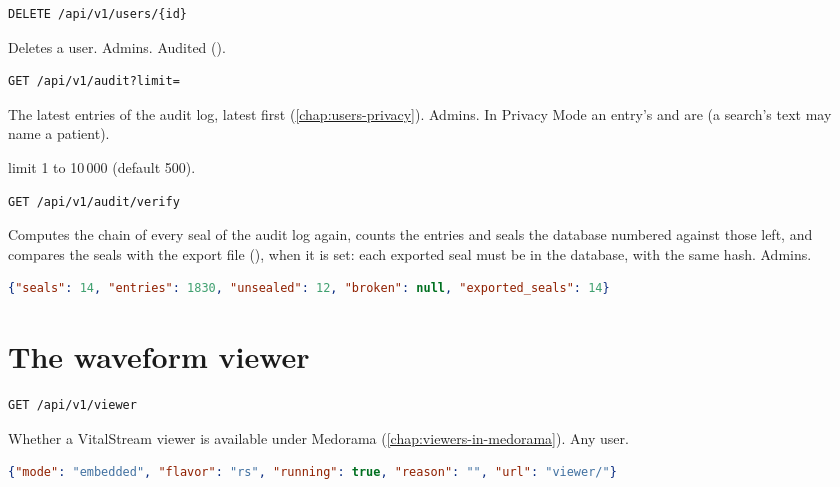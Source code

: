 \begin{lstlisting}[style=signature]
DELETE /api/v1/users/{id}
\end{lstlisting}
Deletes a user. Admins. Audited ().

\begin{lstlisting}[style=signature]
GET /api/v1/audit?limit=
\end{lstlisting}
The latest entries of the audit log, latest first (\cref{chap:users-privacy}). Admins. In
Privacy Mode an entry's  and  are \code{[Withheld]} (a search's text
may name a patient).
\begin{params}
\item[limit] 1 to 10\,000 (default 500).
\end{params}

\begin{lstlisting}[style=signature]
GET /api/v1/audit/verify
\end{lstlisting}
Computes the chain of every seal of the audit log again, counts the entries and seals the
database numbered against those left, and compares the seals with the export file
(), when it is set: each exported seal must be in the database, with the
same hash. Admins.
\begin{lstlisting}[language=JSON]
{"seals": 14, "entries": 1830, "unsealed": 12, "broken": null, "exported_seals": 14}
\end{lstlisting}

\section{The waveform viewer}
\label{sec:http-api-viewer}

\begin{lstlisting}[style=signature]
GET /api/v1/viewer
\end{lstlisting}
Whether a VitalStream viewer is available under Medorama (\cref{chap:viewers-in-medorama}).
Any user.
\begin{lstlisting}[language=JSON]
{"mode": "embedded", "flavor": "rs", "running": true, "reason": "", "url": "viewer/"}
\end{lstlisting}


